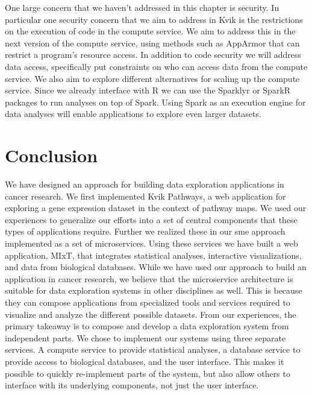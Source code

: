One large concern that we haven't addressed in this chapter is security. In
particular one security concern that we aim to address in Kvik is the
restrictions on the execution of code in the compute service. We aim to address
this in the next version of the compute service, using methods such as
AppArmor\cite{apparmor} that can restrict a program's resource access. In
addition to code security we will address data access, specifically put
constraints on who can access data from the compute service.  We also aim to
explore different alternatives for scaling up the compute service.  Since we
already interface with R we can use the Sparklyr\cite{sparklyr} or
SparkR\cite{sparkr} packages to run analyses on top of
Spark.\cite{zaharia2012resilient} Using Spark as an execution engine for data
analyses will enable applications to explore even larger datasets.

\section{Conclusion}
We have designed an approach for building data exploration applications in
cancer research. We first implemented Kvik Pathways, a web application for
exploring a gene expression dataset in the context of pathway maps. We used our
experiences to generalize our efforts into a set of central components that
these types of applications require. Further we realized these in our \gls{sme}
approach implemented as a set of microservices.  Using these services we have
built a web application, MIxT, that integrates statistical analyses, interactive
visualizations, and data from biological databases. While we have used our
approach to build an application in cancer research, we believe that the
microservice architecture is suitable for data exploration systems in other
disciplines as well. This is because they can compose applications from
specialized tools and services required to visualize and analyze the different
possible datasets. From our experiences, the primary takeaway is to
compose and develop a data exploration system from independent parts.  We chose
to implement our systems using three separate services. A compute service to
provide statistical analyses, a database service to provide access to biological
databases, and the user interface. This makes it possible to quickly
re-implement parts of the system, but also allow others to interface with its
underlying components, not just the user interface. 
